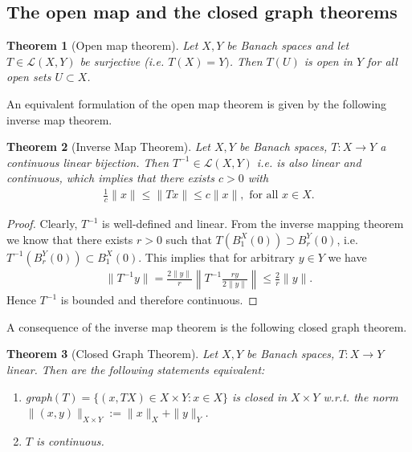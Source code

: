 \documentclass[11pt,a4paper]{article}
\newtheorem{thm}{Theorem}[section]
\theoremstyle{definition}
\begin{document}
\subsection{The open map and the closed graph theorems}
\begin{thm}[Open map theorem] Let $X,Y$ be Banach spaces and let $T \in \mathcal{L}(X,Y)$ be surjective (i.e. $T(X)=Y)$. Then $T(U)$ is open in $Y$ for all open sets $U \subset X$. 
\end{thm}
\noindent An equivalent formulation of the open map theorem is given by the following inverse map theorem.
\begin{thm}[Inverse Map Theorem] Let $X,Y$ be Banach spaces, $T:X \to Y$ a continuous linear bijection. Then $T^{-1} \in \mathcal{L}(X,Y)$ i.e. is also linear and continuous, which implies that there exists $c>0$ with 
\begin{align*}
\frac{1}{c}\|x\| \leq \|Tx\| \leq c\|x\|, \text{ for all } x \in X. 
\end{align*}
\end{thm}
\begin{proof}
Clearly, $T^{-1}$ is well-defined and linear. From the inverse mapping theorem we know that there exists $r>0$ such that $T(B_1^X(0)) \supset B_r^Y(0)$, i.e. $T^{-1}(B_r^Y(0)) \subset B_1^X(0)$. This implies that for arbitrary $y \in Y$ we have 
\begin{align*}
\|T^{-1} y \| = \frac{2\|y\|}{r} \left\| T^{-1} \frac{ry}{2\|y\|} \right\| \leq \frac{2}{r} \|y\|. 
\end{align*}
Hence $T^{-1}$ is bounded and therefore continuous. 
\end{proof}
\noindent A consequence of the inverse map theorem is the following closed graph theorem. 
\begin{thm}[Closed Graph Theorem] Let $X,Y$ be Banach spaces, $T: X \to Y$ linear. Then are the following statements equivalent: 
\begin{enumerate}
\item graph$(T)=\lbrace (x,TX) \in X \times Y : x \in X \rbrace$ is closed in $X \times Y$ w.r.t. the norm $\|(x,y)\|_{X \times Y} := \|x\|_X + \|y\|_Y$.
\item $T$ is continuous.
\end{enumerate}
\end{thm}
\newpage
\end{document}
